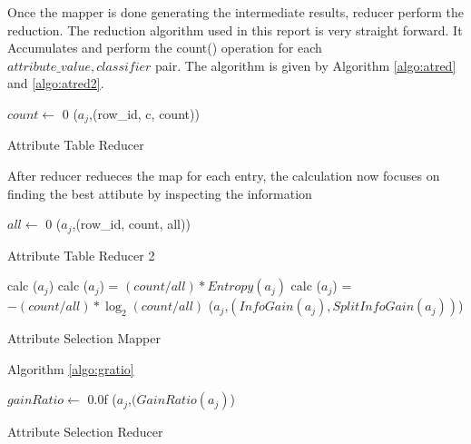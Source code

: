 \documentclass{article}
\begin{document}
Once the mapper is done generating the intermediate results, reducer perform the reduction. The reduction algorithm used in this report is very straight forward. It Accumulates and perform the count() operation for each ${{attribute\_value,classifier}}$ pair. The algorithm is given by Algorithm \ref{algo:atred} and \ref{algo:atred2}.

\IncMargin{1em}
\begin{algorithm}[H]
\DontPrintSemicolon
{}
\BlankLine
$count\leftarrow$ 0\;
\emit(${a_{j}}$,(row\_id, c, count))
\caption{Attribute Table Reducer\label{algo:atred}}
\end{algorithm}
\DecMargin{1em}

After reducer redueces the map for each entry, the calculation now focuses on finding the best attibute by inspecting the information

\IncMargin{1em}
\begin{algorithm}[H]
\DontPrintSemicolon
{}
\BlankLine
$all\leftarrow$ 0\;
\emit(${a_{j}}$,(row\_id, count, all))
\caption{Attribute Table Reducer 2\label{algo:atred}}
\end{algorithm}
\DecMargin{1em}

\IncMargin{1em}
\begin{algorithm}[H]
\DontPrintSemicolon
{}
\BlankLine
calc \Entropy(${a_{j}}$)\;
calc \InfoGain(${a_{j}}$) = ${(count/all) * Entropy(a_{j})}$\;
calc \SplitInfoGain(${a_{j}}$) = ${- (count/all) * \log_{2}{(count/all)}}$\;
\emit(${a_{j}}$,$(InfoGain(a_{j}), SplitInfoGain(a_{j}))$)
\caption{Attribute Selection Mapper\label{algo:atred2}}
\end{algorithm}
\DecMargin{1em}

Algorithm \ref{algo:gratio}

\IncMargin{1em}
\begin{algorithm}[H]
\DontPrintSemicolon
{}
\BlankLine
$gainRatio\leftarrow$ 0.0f\;
\emit(${a_{j}}$,$(GainRatio(a_{j})$)
\caption{Attribute Selection Reducer\label{algo:atred}}
\end{algorithm}
\DecMargin{1em}
\end{document}
